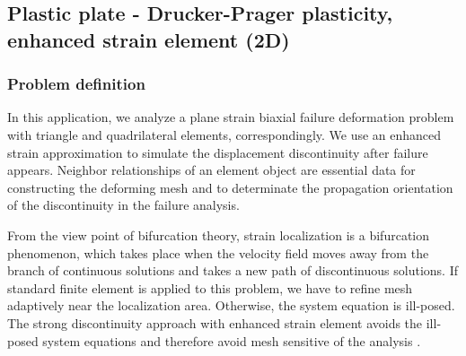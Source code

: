 \subsection[Plastic plate - Drucker-Prager plasticity (2D)]{Plastic plate - Drucker-Prager plasticity, enhanced strain element (2D)}

\subsubsection*{Problem definition}

In this application, we analyze a plane strain biaxial failure
de\-for\-ma\-tion problem with triangle and quadrilateral
elements, correspondingly. We use an enhanced strain approximation
to simulate the displacement discontinuity after failure appears.
Neighbor relationships of an element object are essential data for
constructing the deforming mesh and to determinate the propagation
orientation of the discontinuity in the failure analysis.

From the view point of bifurcation theory, strain localization is a
bifurcation phenomenon, which takes place when the velocity field
moves away from the branch of continuous solutions and takes a new
path of discontinuous solutions. If standard finite element is
applied to this problem, we have to refine mesh adaptively near the
localization area. Otherwise, the system equation is ill-posed. The
strong discontinuity approach with enhanced strain element avoids
the ill-posed system equations and therefore avoid mesh sensitive of
the analysis \cite{SanWri84}.

